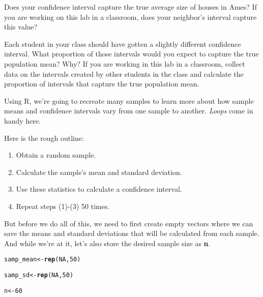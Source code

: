 \documentclass{article}\usepackage[]{graphicx}\usepackage[]{color}
\makeatletter
\newcommand{\hlnum}[1]{\textcolor[rgb]{0.686,0.059,0.569}{#1}}%
\newcommand{\hlstd}[1]{\textcolor[rgb]{0.345,0.345,0.345}{#1}}%
\newcommand{\hlkwb}[1]{\textcolor[rgb]{0.69,0.353,0.396}{#1}}%
\newcommand{\hlkwd}[1]{\textcolor[rgb]{0.737,0.353,0.396}{\textbf{#1}}}%
\newenvironment{kframe}{%
 \def\at@end@of@kframe{}%
 \ifinner\ifhmode%
  \def\at@end@of@kframe{\end{minipage}}%
  \begin{minipage}{\columnwidth}%
 \fi\fi%
 \def\FrameCommand##1{\hskip\@totalleftmargin \hskip-\fboxsep
 \colorbox{shadecolor}{##1}\hskip-\fboxsep
     \hskip-\linewidth \hskip-\@totalleftmargin \hskip\columnwidth}%
 \MakeFramed {\advance\hsize-\width
   \@totalleftmargin\z@ \linewidth\hsize
   \@setminipage}}%
 {\par\unskip\endMakeFramed%
 \at@end@of@kframe}
\newenvironment{knitrout}{}{} %
\makeatother
\begin{document}
\begin{exercise}
Does your confidence interval capture the true average size of houses in Ames? If you are working on this lab in a classroom, does your neighbor's interval capture this value? 
\end{exercise}

\begin{exercise}
Each student in your class should have gotten a slightly different confidence interval. What proportion of those intervals would you expect to capture the true population mean? Why? If you are working in this lab in a classroom, collect data on the intervals created by other students in the class and calculate the proportion of intervals that capture the true population mean.
\end{exercise}

Using R, we're going to recreate many samples to learn more about how sample means and confidence intervals vary from one sample to another. \emph{Loops} come in handy here.

Here is the rough outline:
\begin{enumerate}[(1)]
\item Obtain a random sample.
\item Calculate the sample's mean and standard deviation.
\item Use these statistics to calculate a confidence interval.
\item Repeat steps (1)-(3) 50 times.
\end{enumerate}

But before we do all of this, we need to first create empty vectors where we can save the means and standard deviations that will be calculated from each sample. And while we're at it, let's also store the desired sample size as \hlkwd{n}.

\begin{knitrout}
\color{fgcolor}\begin{kframe}
\begin{alltt}
\hlstd{samp_mean} \hlkwb{<-} \hlkwd{rep}\hlstd{(}\hlnum{NA}\hlstd{,} \hlnum{50}\hlstd{)}

\hlstd{samp_sd} \hlkwb{<-} \hlkwd{rep}\hlstd{(}\hlnum{NA}\hlstd{,} \hlnum{50}\hlstd{)}

\hlstd{n} \hlkwb{<-} \hlnum{60}
\end{alltt}
\end{kframe}
\end{knitrout}
\end{document}
